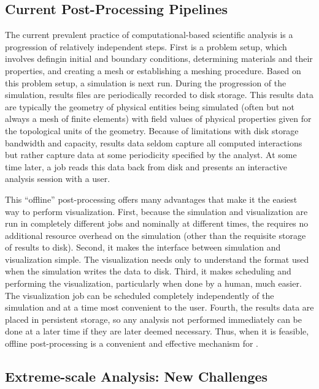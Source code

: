 \subsection{Current Post-Processing Pipelines}

The current prevalent practice of computational-based scientific analysis
is a progression of relatively independent steps.  First is a problem
setup, which involves defingin initial and boundary conditions,
determining materials and their properties, and creating a mesh or
establishing a meshing procedure.  Based on this problem setup, a
simulation is next run.  During the progression of the simulation, results
files are periodically recorded to disk storage.  This results data are
typically the geometry of physical entities being simulated (often but not
always a mesh of finite elements) with field values of physical properties
given for the topological units of the geometry.  Because of limitations
with disk storage bandwidth and capacity, results data seldom capture all
computed interactions but rather capture data at some periodicity specified
by the analyst.  At some time later, a \vda job reads this data back from
disk and presents an interactive analysis session with a user.

This ``offline'' post-processing \vda offers many advantages that make it
the easiest way to perform visualization.  First, because the simulation
and visualization are run in completely different jobs and nominally at
different times, the \vda requires no additional resource overhead on the
simulation (other than the requisite storage of results to disk).  Second,
it makes the interface between simulation and visualization simple.  The
visualization needs only to understand the format used when the simulation
writes the data to disk.  Third, it makes scheduling and performing the
visualization, particularly when done by a human, much easier.  The
visualization job can be scheduled completely independently of the
simulation and at a time most convenient to the user.  Fourth, the results
data are placed in persistent storage, so any analysis not performed
immediately can be done at a later time if they are later deemed necessary.
Thus, when it is feasible, offline post-processing is a convenient and
effective mechanism for \vda.

\subsection{Extreme-scale Analysis: New Challenges}
\label{sec:NewChallenges}

